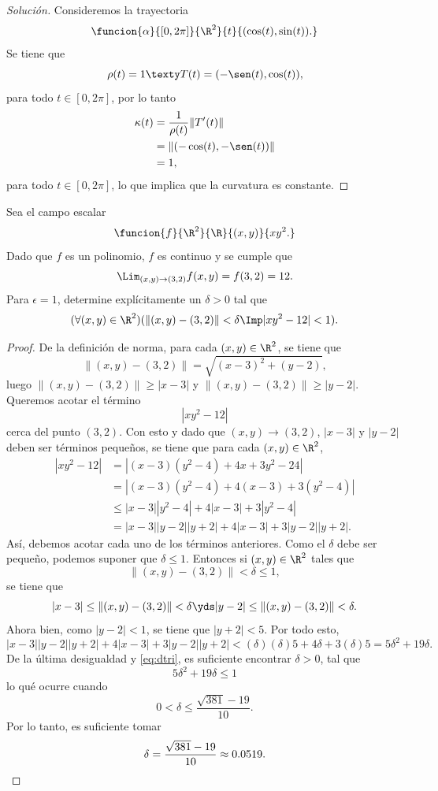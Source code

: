 \documentclass[a4,11pt]{aleph-notas}
\begin{document}
\begin{proof}[Solución]
Consideremos la trayectoria
    \[
        \funcion{\alpha}{[0,2\pi]}{\R^2}{t}{(\cos(t),\sin(t)).}
    \]
    Se tiene que
    \[
        \rho(t)=1
        \texty
        T(t)=(-\sen(t),\cos(t)),
    \]
    para todo $t\in[0,2\pi]$, por lo tanto
    \begin{align*}
        \kappa(t)
            & = \frac{1}{\rho(t)}\|T'(t)\| \\
            & = \|(-\cos(t),-\sen(t))\| \\
            & = 1,
    \end{align*}
    para todo $t\in[0,2\pi]$, lo que implica que la curvatura es constante.
\end{proof}
\item 
    Sea el campo escalar
    \[
        \funcion{f}{\R^2}{\R}{(x,y)}{xy^2.}
    \]
    Dado que $f$ es un polinomio, $f$ es continuo y se cumple que
    \[
        \Lim_{(x,y)\to (3,2)}f(x,y)=f(3,2)=12.
    \]
    Para $\epsilon=1$, determine explícitamente un $\delta>0$ tal que
    \[
    (\forall (x,y)\in\R^2)(\|(x,y)-(3,2)\|< \delta \Imp |xy^2-12|<1).
    \]

\begin{proof}    
    De la definición de norma, para cada $(x,y)\in\R^2$, se tiene que
    \[
        \|(x,y)-(3,2)\|=\sqrt{(x-3)^2+(y-2)},
    \]
    luego $\|(x,y)-(3,2)\|\geq |x-3|$ y $\|(x,y)-(3,2)\|\geq |y-2|$. Queremos acotar el término
    \[
        |xy^2-12|
    \]
    cerca del punto $(3,2)$. Con esto y dado que $(x,y)\to (3,2)$,  $|x-3|$ y $|y-2|$ deben ser términos pequeños, se tiene que para cada $(x,y)\in\R^2$, 
    \begin{equation}\label{eq:dtri}
        \begin{split}|xy^2-12|
        &=|(x-3)(y^2-4)+4x+3y^2-24|\\
        &=|(x-3)(y^2-4)+4(x-3)+3(y^2-4)|\\
        &\leq |x-3||y^2-4|+4|x-3|+3|y^2-4|\\
        &=|x-3||y-2||y+2|+4|x-3|+3|y-2||y+2|.
        \end{split}
    \end{equation}
    Así, debemos acotar cada uno de los términos anteriores. Como el $\delta$ debe ser pequeño, podemos suponer que $\delta\leq 1$. Entonces si $(x,y)\in\R^2$ tales que
    \[
        \|(x,y)-(3,2)\|<\delta\leq 1,
    \]
    se tiene que 
    \[
        |x-3|\leq \|(x,y)-(3,2)\|<\delta \yds 
        |y-2|\leq \|(x,y)-(3,2)\|<\delta.
    \]
    Ahora bien, como $|y-2|<1$, se tiene que $|y+2|<5$. Por todo esto,
    \[
        |x-3||y-2||y+2|+4|x-3|+3|y-2||y+2|
        <(\delta)( \delta) 5+4\delta +3 (\delta) 5
        =5\delta^2+19\delta. 
    \]
    De la última desigualdad y \eqref{eq:dtri}, es suficiente encontrar $\delta>0$, tal que
    \[
        5\delta^2+19\delta\leq 1
    \]
    lo qué ocurre cuando 
    \[
        0<\delta\leq \dfrac{ \sqrt{381} - 19}{10}.
    \]
    Por lo tanto, es suficiente tomar
    \[
        \delta=\dfrac{ \sqrt{381} - 19}{10}\approx 0.0519. \qedhere
    \]
\end{proof}
\end{document}
